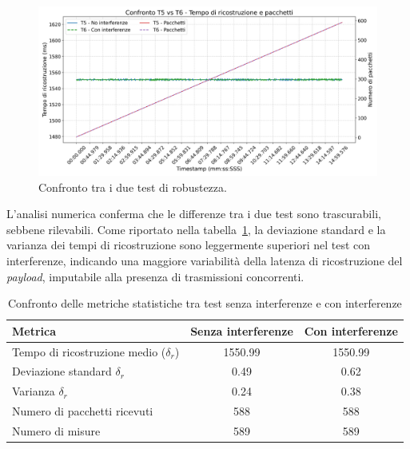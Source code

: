 \documentclass[12pt,a4paper,twoside]{book}
\begin{document}
\begin{figure}[H]
    \centering
    \includegraphics[width=\textwidth]{img/tests/T5-6/T5-6.png}
    \caption{Confronto tra i due test di robustezza.}
    \label{fig:telemetry-robustness-test-comparison}
\end{figure}

L'analisi numerica conferma che le differenze tra i due test sono trascurabili,
sebbene rilevabili. Come riportato nella tabella~\ref{tab:robustness-test-comparison},
la deviazione standard e la varianza dei tempi di ricostruzione sono leggermente
superiori nel test con interferenze, indicando una maggiore variabilità della
latenza di ricostruzione del \emph{payload}, imputabile alla presenza di
trasmissioni concorrenti.
\begin{table}[H]
    \centering
    \begin{tabular}{|l|c|c|}
        \hline
        \textbf{Metrica}                            & \textbf{Senza interferenze} & \textbf{Con interferenze} \\
        \hline
        Tempo di ricostruzione medio ($\delta_{r}$) & 1550.99                     & 1550.99                   \\ \hline
        Deviazione standard $\delta_{r}$            & 0.49                        & 0.62                      \\ \hline
        Varianza $\delta_{r}$                       & 0.24                        & 0.38                      \\ \hline
        Numero di pacchetti ricevuti                & 588                         & 588                       \\ \hline
        Numero di misure                            & 589                         & 589                       \\
        \hline
    \end{tabular}
    \caption{Confronto delle metriche statistiche tra test senza interferenze e con interferenze}

    \label{tab:robustness-test-comparison}
\end{table}
\end{document}
